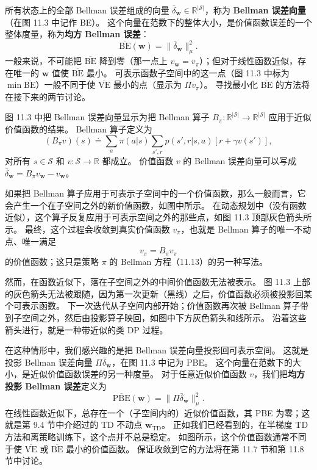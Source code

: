 \documentclass[UTF8,12pt,a4paper,fontset=fandol]{ctexart}
\begin{document}
所有状态上的全部 Bellman 误差组成的向量 $\bar\delta_{\mathbf{w}}\in\mathbb{R}^{|\mathcal{S}|}$，称为 \textbf{Bellman 误差向量}（在图 11.3 中记作 BE）。
这个向量在范数下的整体大小，是价值函数误差的一个整体度量，称为\textbf{均方 Bellman 误差}：
\begin{equation}
\overline{\mathrm{BE}}(\mathbf{w})=\|\bar\delta_{\mathbf{w}}\|_\mu^2.
\tag{11.19}
\end{equation}
一般来说，不可能把 $\overline{\mathrm{BE}}$ 降到零（那一点上 $v_{\mathbf{w}}=v_\pi$）；但对于线性函数近似，存在唯一的 $\mathbf{w}$ 值使 $\overline{\mathrm{BE}}$ 最小。
可表示函数子空间中的这一点（图 11.3 中标为 $\min\overline{\mathrm{BE}}$）一般不同于使 $\overline{\mathrm{VE}}$ 最小的点（显示为 $\Pi v_\pi$）。
寻找最小化 $\overline{\mathrm{BE}}$ 的方法将在接下来的两节讨论。

图 11.3 中把 Bellman 误差向量显示为把 Bellman 算子
$B_\pi:\mathbb{R}^{|\mathcal{S}|}\to\mathbb{R}^{|\mathcal{S}|}$ 应用于近似价值函数的结果。
Bellman 算子定义为
\begin{equation}
(B_\pi v)(s)\doteq \sum_a\pi(a|s)\sum_{s',r}p(s',r|s,a)\left[r+\gamma v(s')\right],
\tag{11.20}
\end{equation}
对所有 $s\in\mathcal{S}$ 和 $v:\mathcal{S}\to\mathbb{R}$ 都成立。
价值函数 $v$ 的 Bellman 误差向量可以写成
$\bar\delta_{\mathbf{w}}=B_\pi v_{\mathbf{w}}-v_{\mathbf{w}}$。

如果把 Bellman 算子应用于可表示子空间中的一个价值函数，那么一般而言，它会产生一个在子空间之外的新价值函数，如图中所示。
在动态规划中（没有函数近似），这个算子反复应用于可表示空间之外的那些点，如图 11.3 顶部灰色箭头所示。
最终，这个过程会收敛到真实价值函数 $v_\pi$，也就是 Bellman 算子的唯一不动点、唯一满足
\begin{equation}
v_\pi=B_\pi v_\pi
\tag{11.21}
\end{equation}
的价值函数；这只是策略 $\pi$ 的 Bellman 方程（11.13）的另一种写法。

然而，在函数近似下，落在子空间之外的中间价值函数无法被表示。
图 11.3 上部的灰色箭头无法被跟随，因为第一次更新（黑线）之后，价值函数必须被投影回某个可表示函数。
下一次迭代从子空间内部开始；价值函数再次被 Bellman 算子带到子空间之外，然后由投影算子映回，如图中下方灰色箭头和线所示。
沿着这些箭头进行，就是一种带近似的类 DP 过程。

在这种情形中，我们感兴趣的是把 Bellman 误差向量投影回可表示空间。
这就是投影 Bellman 误差向量 $\Pi\bar\delta_{\mathbf{w}}$，在图 11.3 中记为 PBE。
这个向量在范数下的大小，是近似价值函数误差的另一种度量。
对于任意近似价值函数 $v$，我们把\textbf{均方投影 Bellman 误差}定义为
\begin{equation}
\overline{\mathrm{PBE}}(\mathbf{w})=\|\Pi\bar\delta_{\mathbf{w}}\|_\mu^2.
\tag{11.22}
\end{equation}
在线性函数近似下，总存在一个（子空间内的）近似价值函数，其 PBE 为零；这就是第 9.4 节中介绍过的 TD 不动点 $\mathbf{w}_{\mathrm{TD}}$。
正如我们已经看到的，在半梯度 TD 方法和离策略训练下，这个点并不总是稳定。
如图所示，这个价值函数通常不同于使 $\overline{\mathrm{VE}}$ 或 $\overline{\mathrm{BE}}$ 最小的价值函数。
保证收敛到它的方法将在第 11.7 节和第 11.8 节中讨论。
\end{document}
